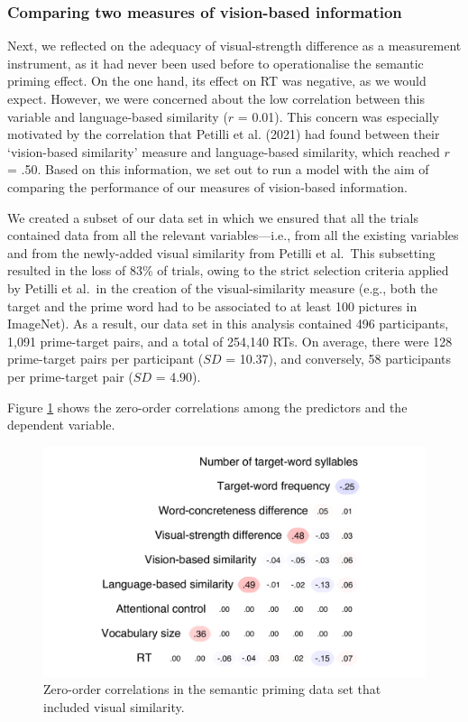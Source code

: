 \documentclass[
  12pt,
  man,floatsintext]{apa7}
\begin{document}
\hypertarget{comparing-two-measures-of-vision-based-information}{%
\subsubsection{Comparing two measures of vision-based information}\label{comparing-two-measures-of-vision-based-information}}

Next, we reflected on the adequacy of visual-strength difference as a measurement instrument, as it had never been used before to operationalise the semantic priming effect. On the one hand, its effect on RT was negative, as we would expect. However, we were concerned about the low correlation between this variable and language-based similarity (\(r\) = 0.01). This concern was especially motivated by the correlation that Petilli et al. (2021) had found between their `vision-based similarity' measure and language-based similarity, which reached \(r\) = .50. Based on this information, we set out to run a model with the aim of comparing the performance of our measures of vision-based information.

We created a subset of our data set in which we ensured that all the trials contained data from all the relevant variables---i.e., from all the existing variables and from the newly-added visual similarity from Petilli et al.~This subsetting resulted in the loss of 83\% of trials, owing to the strict selection criteria applied by Petilli et al.~in the creation of the visual-similarity measure (e.g., both the target and the prime word had to be associated to at least 100 pictures in ImageNet). As a result, our data set in this analysis contained 496 participants, 1,091 prime-target pairs, and a total of 254,140 RTs. On average, there were 128 prime-target pairs per participant (\(SD\) = 10.37), and conversely, 58 participants per prime-target pair (\(SD\) = 4.90).

Figure \ref{fig:semanticpriming-with-visualsimilarity-correlations} shows the zero-order correlations among the predictors and the dependent variable.

\begin{figure}

{\centering \includegraphics[width=0.73\linewidth]{manuscript_files/figure-latex/semanticpriming-with-visualsimilarity-correlations-1} 

}

\caption{Zero-order correlations in the semantic priming data set that included visual similarity.}\label{fig:semanticpriming-with-visualsimilarity-correlations}
\end{figure}
\end{document}
